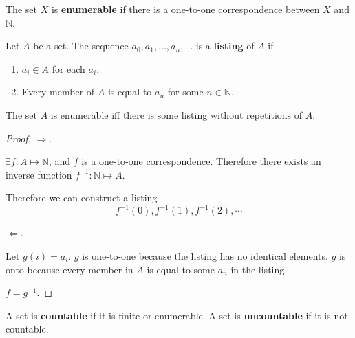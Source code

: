 \begin{definition}
    \label{def:EnumerableSets}
    The set $X$ is \textbf{enumerable} if there is a one-to-one correspondence between $X$ and $\mathbb{N}$.
\end{definition}

\begin{definition}
    \label{def:ListingOfSets}
    Let $A$ be a set. The sequence $a_0, a_1, \dots, a_n, \dots$ is a \textbf{listing} of $A$ if
    \begin{enumerate}
        \item $a_i \in A$ for each $a_i$.
        \item Every member of $A$ is equal to $a_n$ for some $n \in \mathbb{N}$.
    \end{enumerate}
\end{definition}

\begin{theorem}
    \label{thm:ListingAndEnumerableSets}
    The set $A$ is enumerable iff there is some listing without repetitions of $A$.
\end{theorem}
\begin{proof}
    $\Rightarrow$.

    $\exists f: A \mapsto \mathbb{N}$, and $f$ is a one-to-one correspondence. Therefore there exists an inverse function $f^{-1}: \mathbb{N} \mapsto A$.

    Therefore we can construct a listing
    $$ f^{-1}(0), f^{-1}(1), f^{-1}(2), \cdots $$

    $\Leftarrow$.

    Let $g(i) = a_i$. $g$ is one-to-one because the listing has no identical elements. $g$ is onto because every member in $A$ is equal to some $a_n$ in the listing.

    $f = g^{-1}$.
\end{proof}

\begin{definition}
    \label{def:CountableSets}
    A set is \textbf{countable} if it is finite or enumerable. A set is \textbf{uncountable} if it is not countable.
\end{definition}


